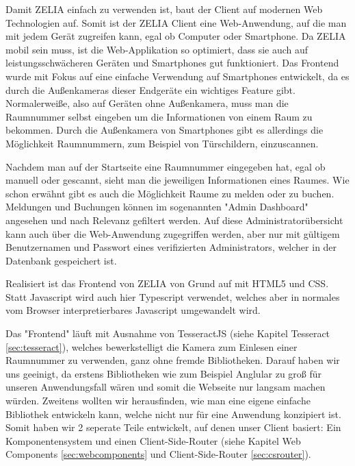 
Damit ZELIA einfach zu verwenden ist, baut der Client auf modernen Web Technologien auf. Somit ist der ZELIA Client eine Web-Anwendung, auf die man mit jedem Gerät zugreifen kann, egal ob Computer oder Smartphone. Da ZELIA mobil sein muss, ist die Web-Applikation so optimiert, dass sie auch auf leistungsschwächeren Geräten und Smartphones gut funktioniert. Das Frontend wurde mit Fokus auf eine einfache Verwendung auf Smartphones entwickelt, da es durch die Außenkameras dieser Endgeräte ein wichtiges Feature gibt. Normalerweiße, also auf Geräten ohne Außenkamera, muss man die Raumnummer selbst eingeben um die Informationen von einem Raum zu bekommen. Durch die Außenkamera von Smartphones gibt es allerdings die Möglichkeit Raumnummern, zum Beispiel von Türschildern, einzuscannen. 

Nachdem man auf der Startseite eine Raumnummer eingegeben hat, egal ob manuell oder gescannt, sieht man die jeweiligen Informationen eines Raumes. Wie schon erwähnt gibt es auch die Möglichkeit Raume zu melden oder zu buchen. Meldungen und Buchungen können im sogenannten "Admin Dashboard" angesehen und nach Relevanz gefiltert werden. Auf diese Administratorübersicht kann auch über die Web-Anwendung zugegriffen werden, aber nur mit gültigem Benutzernamen und Passwort eines verifizierten Administrators, welcher in der Datenbank gespeichert ist.

Realisiert ist das Frontend von ZELIA von Grund auf mit HTML5 und CSS. Statt Javascript wird auch hier Typescript verwendet, welches aber in normales vom Browser interpretierbares Javascript umgewandelt wird. 

Das "Frontend" läuft mit Ausnahme von TesseractJS (siehe Kapitel Tesseract \ref{sec:tesseract}), welches bewerkstelligt die Kamera zum Einlesen einer Raumnummer zu verwenden, ganz ohne fremde Bibliotheken. Darauf haben wir uns geeinigt, da erstens Bibliotheken wie zum Beispiel Anglular zu groß für unseren Anwendungsfall wären und somit die Webseite nur langsam machen würden. Zweitens wollten wir herausfinden, wie man eine eigene einfache Bibliothek entwickeln kann, welche nicht nur für eine Anwendung konzipiert ist. Somit haben wir 2 seperate Teile entwickelt, auf denen unser Client basiert: Ein Komponentensystem und einen Client-Side-Router (siehe Kapitel Web Components \ref{sec:webcomponents} und Client-Side-Router \ref{sec:csrouter}).